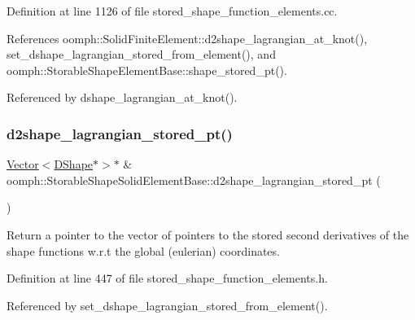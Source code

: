 Definition at line 1126 of file stored\+\_\+shape\+\_\+function\+\_\+elements.\+cc.



References oomph\+::\+Solid\+Finite\+Element\+::d2shape\+\_\+lagrangian\+\_\+at\+\_\+knot(), set\+\_\+dshape\+\_\+lagrangian\+\_\+stored\+\_\+from\+\_\+element(), and oomph\+::\+Storable\+Shape\+Element\+Base\+::shape\+\_\+stored\+\_\+pt().



Referenced by dshape\+\_\+lagrangian\+\_\+at\+\_\+knot().

\mbox{\label{classoomph_1_1StorableShapeSolidElementBase_a7b8adfda8200cdd3a7ecbb7d01c14605}} 
\subsubsection{\texorpdfstring{d2shape\+\_\+lagrangian\+\_\+stored\+\_\+pt()}{d2shape\_lagrangian\_stored\_pt()}\hspace{0.1cm}{\footnotesize\ttfamily [1/2]}}
{\footnotesize\ttfamily \hyperlink{classoomph_1_1Vector}{Vector}$<$\hyperlink{classoomph_1_1DShape}{D\+Shape}$\ast$$>$$\ast$ \& oomph\+::\+Storable\+Shape\+Solid\+Element\+Base\+::d2shape\+\_\+lagrangian\+\_\+stored\+\_\+pt (\begin{DoxyParamCaption}{ }\end{DoxyParamCaption})\hspace{0.3cm}{\ttfamily [inline]}}



Return a pointer to the vector of pointers to the stored second derivatives of the shape functions w.\+r.\+t the global (eulerian) coordinates. 



Definition at line 447 of file stored\+\_\+shape\+\_\+function\+\_\+elements.\+h.



Referenced by set\+\_\+dshape\+\_\+lagrangian\+\_\+stored\+\_\+from\+\_\+element().

\mbox{\label{classoomph_1_1StorableShapeSolidElementBase_a3a6c1f65abc9dca34fa0cd4e88b888cb}} 
